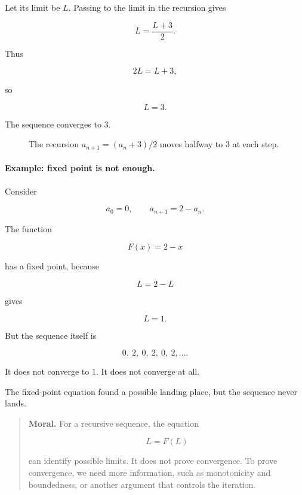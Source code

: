 Let its limit be \(L\).  Passing to the limit in the recursion gives

\[
L=\frac{L+3}{2}.
\]

Thus

\[
2L=L+3,
\]

so

\[
\boxed{L=3.}
\]

The sequence converges to \(3\).

\begin{figure}[h]
\centering
{}
\caption{The recursion \(a_{n+1}=(a_n+3)/2\) moves halfway to \(3\) at each step.}
\label{fig:recursive-halfway-to-three}
\end{figure}

\paragraph{Example: fixed point is not enough.}
Consider

\[
a_0=0,
\qquad
a_{n+1}=2-a_n.
\]

The function

\[
F(x)=2-x
\]

has a fixed point, because

\[
L=2-L
\]

gives

\[
L=1.
\]

But the sequence itself is

\[
0,\ 2,\ 0,\ 2,\ 0,\ 2,\ldots.
\]

It does not converge to \(1\).  It does not converge at all.

The fixed-point equation found a possible landing place, but the sequence never lands.

\begin{quote}
\textbf{Moral.}
For a recursive sequence, the equation

\[
L=F(L)
\]

can identify possible limits.  It does not prove convergence.  To prove convergence, we
need more information, such as monotonicity and boundedness, or another argument that
controls the iteration.
\end{quote}

